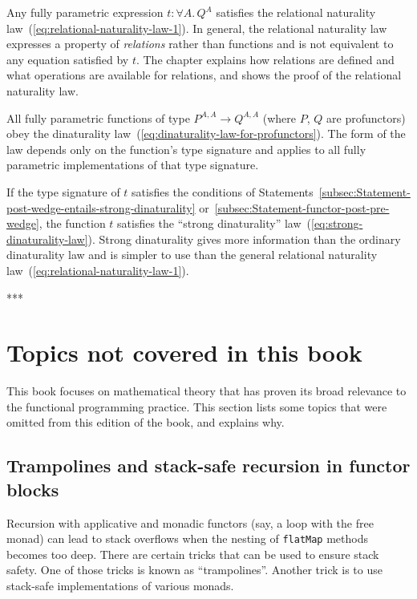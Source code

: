 Any fully parametric expression $t:\forall A.\,Q^{A}$ satisfies the
relational naturality law~(\ref{eq:relational-naturality-law-1}).
In general, the relational naturality law expresses a property of
\emph{relations} rather than functions and is not equivalent to any
equation satisfied by $t$. The chapter explains how relations are
defined and what operations are available for relations, and shows
the proof of the relational naturality law.

All fully parametric functions of type $P^{A,A}\rightarrow Q^{A,A}$
(where $P$, $Q$ are profunctors) obey the dinaturality law~(\ref{eq:dinaturality-law-for-profunctors}).
The form of the law depends only on the function\textsf{'}s type signature
and applies to all fully parametric implementations of that type signature.

If the type signature of $t$ satisfies the conditions of Statements~\ref{subsec:Statement-post-wedge-entails-strong-dinaturality}
or~\ref{subsec:Statement-functor-post-pre-wedge}, the function $t$
satisfies the \textsf{``}strong dinaturality\textsf{''} law~(\ref{eq:strong-dinaturality-law}).
Strong dinaturality gives more information than the ordinary dinaturality
law and is simpler to use than the general relational naturality law~(\ref{eq:relational-naturality-law-1}).

{*}{*}{*}

\setcounter{secnumdepth}{3}%
\begin{comment}
Restore the normal numbering of subsections and subsubsections
\end{comment}


\section{Topics not covered in this book}

This book focuses on mathematical theory that has proven its broad
relevance to the functional programming practice. This section lists
some topics that were omitted from this edition of the book, and explains
why.

\subsection{Trampolines and stack-safe recursion in functor blocks}

Recursion with applicative and monadic functors (say, a loop with
the free monad) can lead to stack overflows when the nesting of \lstinline!flatMap!
methods becomes too deep. There are certain tricks that can be used
to ensure stack safety. One of those tricks is known as \textsf{``}trampolines\textsf{''}.
Another trick is to use stack-safe implementations of various monads. 

